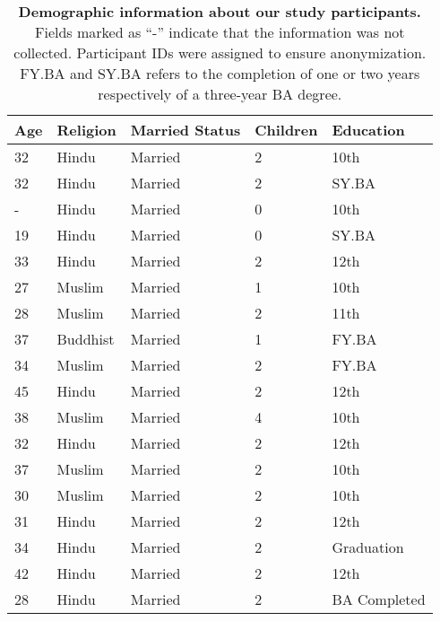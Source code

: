 \begin{table}
\centering
\small
\begin{tabular}{l l l l l}
\toprule
\textbf{Age} & \textbf{Religion} & \textbf{Married Status} & \textbf{Children} & \textbf{Education}  \\ 
\toprule
32 & Hindu & Married & 2 & 10th  \\ 
32 & Hindu & Married & 2 & SY.BA \\ 
- & Hindu & Married & 0 & 10th  \\ 
19 & Hindu & Married & 0 & SY.BA  \\ 
33 & Hindu & Married & 2 & 12th  \\ 
27 & Muslim & Married & 1 & 10th  \\ 
28 & Muslim & Married & 2 & 11th \\ 
37 & Buddhist & Married & 1 & FY.BA \\ 
34 & Muslim & Married & 2 & FY.BA \\ 
45 & Hindu & Married & 2 & 12th \\ 
38 & Muslim & Married & 4 & 10th \\ 
32 & Hindu & Married & 2 & 12th \\ 
37 & Muslim & Married & 2 & 10th \\ 
30 & Muslim & Married & 2 & 10th  \\ 
31 & Hindu & Married & 2 & 12th  \\ 
34 & Hindu & Married & 2 & Graduation  \\ 
42 & Hindu & Married & 2 & 12th \\ 
28 & Hindu & Married & 2 & BA Completed  \\ 
\bottomrule
  \end{tabular}\\
 \caption{\textbf{Demographic information about our study participants.} Fields marked as “-” indicate that the information was not collected. Participant IDs were assigned to ensure anonymization. FY.BA and SY.BA refers to the completion of one or two years respectively of a three-year BA degree.}
  \label{tab:demo}
  \end{table}
